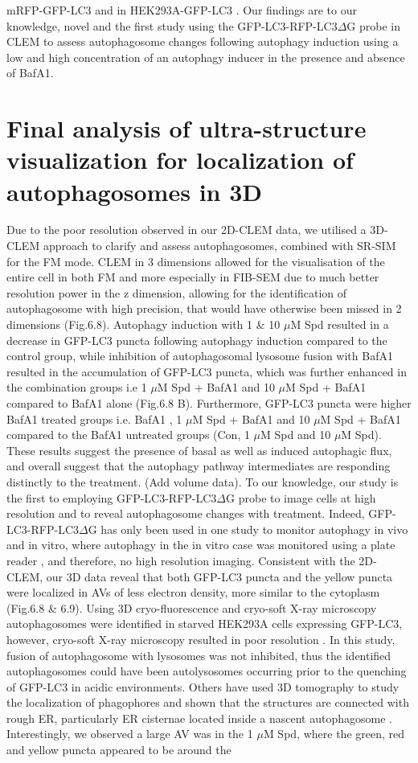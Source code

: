 mRFP-GFP-LC3 \citep{Gudmundsson2019} and in HEK293A-GFP-LC3 \citep{Razi2009}. Our findings are to our knowledge, novel and the first study using the GFP-LC3-RFP-LC3$\Delta$G probe in CLEM to assess autophagosome changes following autophagy induction using a low and high concentration  of an autophagy inducer in the presence and absence of BafA1.
\section{Final analysis of ultra-structure visualization for localization of autophagosomes in 3D}
Due to the poor resolution observed in our 2D-CLEM data, we utilised a  3D-CLEM approach to clarify and assess autophagosomes, combined with SR-SIM for the FM mode. CLEM in 3 dimensions allowed for the visualisation of the entire cell in both FM and more especially in FIB-SEM due to much better resolution power in the z dimension, allowing for the identification of autophagosome with high precision, that would have otherwise been missed in 2 dimensions (Fig.6.8). Autophagy induction with 1 \& 10 $\mu$M Spd resulted in a decrease in GFP-LC3 puncta following autophagy induction compared to the control group, while inhibition of autophagosomal lysosome fusion with BafA1 resulted in the accumulation of GFP-LC3 puncta, which was further enhanced in the combination groups i.e 1 $\mu$M Spd + BafA1 and 10 $\mu$M Spd + BafA1 compared to BafA1 alone (Fig.6.8 B). Furthermore, GFP-LC3 puncta were higher BafA1 treated groups i.e. BafA1 , 1 $\mu$M Spd + BafA1 and 10 $\mu$M Spd + BafA1 compared to the BafA1 untreated groups (Con, 1 $\mu$M Spd and 10 $\mu$M Spd). These results suggest the presence of basal as well as induced autophagic flux, and overall suggest that the autophagy pathway intermediates are responding distinctly to the treatment. (Add volume data). To our knowledge, our study is the first to employing GFP-LC3-RFP-LC3$\Delta$G probe to image cells at high resolution and to reveal autophagosome changes with treatment. Indeed, GFP-LC3-RFP-LC3$\Delta$G has only been used in one study to monitor autophagy in vivo and in vitro, where autophagy in the in vitro case was monitored using a plate reader \citep{Kaizuka2016}, and therefore, no high resolution imaging. Consistent with the 2D-CLEM, our 3D data reveal that both GFP-LC3 puncta and the yellow puncta were localized in AVs of less electron density, more similar to the cytoplasm (Fig.6.8 \& 6.9). Using 3D cryo-fluorescence and cryo-soft X-ray microscopy autophagosomes were identified in starved HEK293A cells expressing GFP-LC3, however, cryo-soft X-ray microscopy resulted in poor resolution \citep{Duke2014}. In this study, fusion of autophagosome with lysosomes was not inhibited, thus the identified autophagosomes could have been autolysosomes occurring prior to the quenching of GFP-LC3 in acidic environments. Others have used 3D tomography to study the localization of phagophores and shown that the structures are connected with rough ER, particularly ER cisternae located inside a nascent autophagosome \citep{Yla-Anttila2009}. Interestingly, we observed a large AV was in the 1 $\mu$M Spd, where the green, red and yellow puncta appeared to be around the 